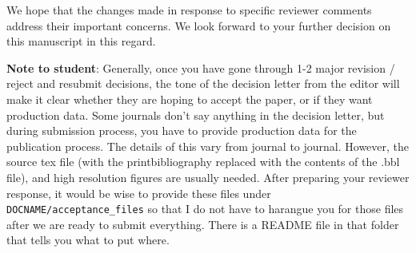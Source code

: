 \documentclass[12pt]{article}
\begin{document}
We hope that the changes made in response to specific reviewer comments address their important concerns. We look forward to your further decision on this manuscript in this regard.

\textbf{Note to student}: Generally, once you have gone through 1-2 major revision / reject and resubmit decisions, the tone of the decision letter from the editor will make it clear whether they are hoping to accept the paper, or if they want production data. Some journals don't say anything in the decision letter, but during submission process, you have to provide production data for the publication process. The details of this vary from journal to journal. However, the source tex file (with the printbibliography replaced with the contents of the .bbl file), and high resolution figures are usually needed.  After preparing your reviewer response, it would be wise to provide these files under \verb|DOCNAME/acceptance_files| so that I do not have to harangue you for those files after we are ready to submit everything. There is a README file in that folder that tells you what to put where.

\printbibliography
\end{document}
